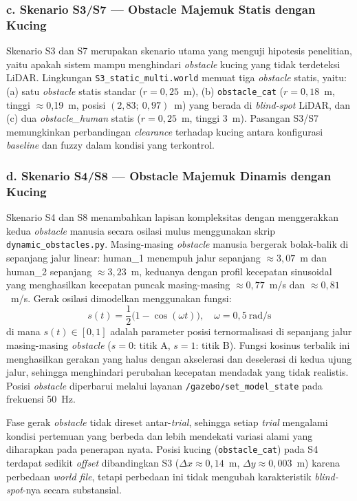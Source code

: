 \subsubsection*{c. Skenario S3/S7 --- Obstacle Majemuk Statis dengan Kucing}

Skenario S3 dan S7 merupakan skenario utama yang menguji hipotesis penelitian, yaitu apakah sistem mampu menghindari \textit{obstacle} kucing yang tidak terdeteksi LiDAR. Lingkungan \texttt{S3\_static\_multi.world} memuat tiga \textit{obstacle} statis, yaitu: (a) satu \textit{obstacle} statis standar ($r = 0{,}25$~m), (b) \texttt{obstacle\_cat} ($r = 0{,}18$~m, tinggi $\approx$0,19~m, posisi $(2{,}83;\ 0{,}97)$~m) yang berada di \textit{blind-spot} LiDAR, dan (c) dua \textit{obstacle\_human} statis ($r = 0{,}25$~m, tinggi 3~m). Pasangan S3/S7 memungkinkan perbandingan \textit{clearance} terhadap kucing antara konfigurasi \textit{baseline} dan fuzzy dalam kondisi yang terkontrol.

\subsubsection*{d. Skenario S4/S8 --- Obstacle Majemuk Dinamis dengan Kucing}

Skenario S4 dan S8 menambahkan lapisan kompleksitas dengan menggerakkan kedua \textit{obstacle} manusia secara osilasi mulus menggunakan skrip \texttt{dynamic\_obstacles.py}. Masing-masing \textit{obstacle} manusia bergerak bolak-balik di sepanjang jalur linear: human\_1 menempuh jalur sepanjang $\approx 3{,}07$~m dan human\_2 sepanjang $\approx 3{,}23$~m, keduanya dengan profil kecepatan sinusoidal yang menghasilkan kecepatan puncak masing-masing $\approx 0{,}77$~m/s dan $\approx 0{,}81$~m/s. Gerak osilasi dimodelkan menggunakan fungsi:
\begin{equation}
    s(t) = \frac{1}{2}\bigl(1 - \cos(\omega t)\bigr),
    \quad \omega = 0{,}5~\text{rad/s}
    \label{eq:osilasi_human}
\end{equation}
di mana $s(t) \in [0, 1]$ adalah parameter posisi ternormalisasi di sepanjang jalur masing-masing \textit{obstacle} ($s=0$: titik A, $s=1$: titik B). Fungsi kosinus terbalik ini menghasilkan gerakan yang halus dengan akselerasi dan deselerasi di kedua ujung jalur, sehingga menghindari perubahan kecepatan mendadak yang tidak realistis. Posisi \textit{obstacle} diperbarui melalui layanan \texttt{/gazebo/set\_model\_state} pada frekuensi 50~Hz.

Fase gerak \textit{obstacle} tidak direset antar-\textit{trial}, sehingga setiap \textit{trial} mengalami kondisi pertemuan yang berbeda dan lebih mendekati variasi alami yang diharapkan pada penerapan nyata. Posisi kucing (\texttt{obstacle\_cat}) pada S4 terdapat sedikit \textit{offset} dibandingkan S3 ($\Delta x \approx 0{,}14$~m, $\Delta y \approx 0{,}003$~m) karena perbedaan \textit{world file}, tetapi perbedaan ini tidak mengubah karakteristik \textit{blind-spot}-nya secara substansial.


